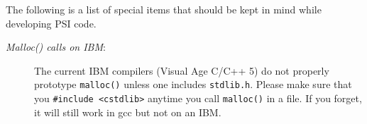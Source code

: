 % 
%
%
%
%

The following is a list of special items that should be kept in mind
while developing PSI code.

\begin{description}
\item [{\em Malloc() calls on IBM}:] The current IBM compilers (Visual Age
  C/C++ 5) do not properly prototype {\tt malloc()} unless one includes
  {\tt stdlib.h}.  Please make sure that you {\tt \#include <cstdlib>}
  anytime you call {\tt malloc()} in a file.  If you forget, it will
  still work in gcc but not on an IBM.
\end{description}

